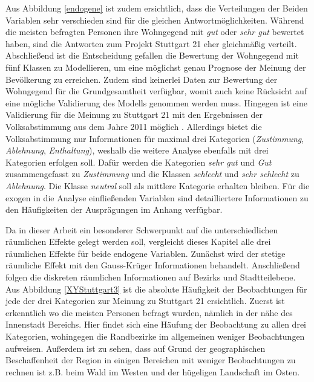 \documentclass{Vorlage}
\begin{document}
Aus Abbildung \ref{endogene} ist zudem ersichtlich, dass die Verteilungen der Beiden Variablen sehr verschieden sind für die gleichen Antwortmöglichkeiten. Während die meisten befragten Personen ihre Wohngegend mit \textit{gut} oder \textit{sehr gut} bewertet haben, sind die Antworten zum Projekt Stuttgart 21 eher gleichmäßig verteilt.\\
Abschließend ist die Entscheidung gefallen die Bewertung der Wohngegend mit fünf Klassen zu Modellieren, um eine möglichst genau Prognose der Meinung der Bevölkerung zu erreichen. Zudem sind keinerlei Daten zur Bewertung der Wohngegend für die Grundgesamtheit verfügbar, womit auch keine Rücksicht auf eine mögliche Validierung des Modells genommen werden muss. Hingegen ist eine Validierung für die Meinung zu Stuttgart 21 mit den Ergebnissen der Volksabstimmung aus dem Jahre 2011 möglich \cite{Amt}. Allerdings bietet die Volksabstimmung nur Informationen für maximal drei Kategorien (\textit{Zustimmung}, \textit{Ablehnung}, \textit{Enthaltung}), weshalb die weitere Analyse ebenfalls mit drei Kategorien erfolgen soll. Dafür werden die Kategorien \textit{sehr gut} und \textit{Gut} zusammengefasst zu \textit{Zustimmung} und die Klassen \textit{schlecht} und \textit{sehr schlecht} zu \textit{Ablehnung}. Die Klasse \textit{neutral} soll als mittlere Kategorie erhalten bleiben. 
Für die exogen in die Analyse einfließenden Variablen sind detailliertere Informationen zu den Häufigkeiten der Ausprägungen im Anhang verfügbar. 

\newpage


Da in dieser Arbeit ein besonderer Schwerpunkt auf die unterschiedlichen räumlichen Effekte gelegt werden soll, vergleicht dieses Kapitel alle drei räumlichen Effekte für beide endogene Variablen. Zunächst wird der stetige räumliche Effekt mit den Gauss-Krüger Informationen behandelt. Anschließend folgen die diskreten räumlichen Informationen auf Bezirks und Stadtteilebene.\\
Aus Abbildung \ref{XYStuttgart3} ist die absolute Häufigkeit der Beobachtungen für jede der drei Kategorien zur Meinung zu Stuttgart 21 ersichtlich. Zuerst ist erkenntlich wo die meisten Personen befragt wurden, nämlich in der nähe des Innenstadt Bereichs. Hier findet sich eine Häufung der Beobachtung zu allen drei Kategorien, wohingegen die Randbezirke im allgemeinen weniger Beobachtungen aufweisen. Außerdem ist zu sehen, dass auf Grund der geographischen Beschaffenheit der Region in einigen Bereichen mit weniger Beobachtungen zu rechnen ist z.B. beim Wald im Westen und der hügeligen Landschaft im Osten.    
\end{document}
